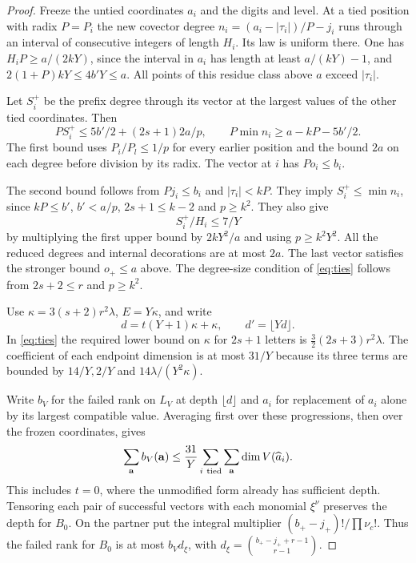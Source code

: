 \begin{proof}
Freeze the untied coordinates \(a_i\) and the digits and level.
At a tied position with radix \(P=P_i\) the new covector degree
\(n_i=(a_i-|\tau_i|)/P-j_i\) runs through an interval of
consecutive integers of length \(H_i\). Its law is uniform there.
One has \(H_iP\ge a/(2kY)\), since the interval in \(a_i\)
has length at least \(a/(kY)-1\), and
\(2(1+P)kY\le4b'Y\le a\). All points of this residue class above
\(a\) exceed \(|\tau_i|\).

Let \(S_i^+\) be the prefix degree
through its vector at the largest values of the other tied
coordinates. Then
\[
 P S_i^+\le 5b'/2+(2s+1)2a/p,\qquad
 P\min n_i\ge a-kP-5b'/2.
\]
The first bound uses \(P_i/P_l\le1/p\) for every earlier position
and the bound \(2a\) on each degree before division by its radix.
The vector at \(i\) has \(Po_i\le b_i\).

The second bound follows
from \(Pj_i\le b_i\) and \(|\tau_i|<kP\).
They imply \(S_i^+\le\min n_i\), since \(kP\le b'\),
\(b'<a/p\), \(2s+1\le k-2\) and \(p\ge k^2\).
They also give
\[
 S_i^+/H_i\le7/Y
\]
by multiplying the
first upper bound by \(2kY^2/a\) and using \(p\ge k^2Y^2\).
All the reduced degrees and internal decorations are at most \(2a\).
The last vector satisfies the stronger bound \(o_+\le a\) above.
The degree-size condition of \eqref{eq:ties} follows from
\(2s+2\le r\) and \(p\ge k^2\).

Use \(\kappa=3(s+2)r^2\lambda\), \(E=Y\kappa\), and write
\begin{equation}\label{eq:segment-mean-depth}
 d=t(Y+1)\kappa+\kappa,\qquad d'=\lfloor Yd\rfloor.
\end{equation}
In \eqref{eq:ties} the required lower bound on \(\kappa\) for
\(2s+1\) letters is \(\tfrac32(2s+3)r^2\lambda\).
The coefficient of each endpoint dimension is at most \(31/Y\)
because its three terms are bounded by \(14/Y,2/Y\) and
\(14\lambda/(Y^2\kappa)\).

Write \(b_V\) for the failed rank on
\(L_V\) at depth \(\lfloor d\rfloor\) and \(\widehat a_i\) for
replacement of \(a_i\) alone by its largest compatible value.
Averaging first over these progressions, then over the frozen
coordinates, gives
\begin{equation}\label{eq:seg-interior}
 \sum_{\mathbf a} b_V(\mathbf a)
   \le \frac{31}{Y}\sum_{i\ {\rm tied}}\sum_{\mathbf a}
                     \dim V(\widehat a_i).
\end{equation}
This includes \(t=0\), where the unmodified form already has
sufficient depth. Tensoring each pair of successful vectors with
each monomial \(\xi^\nu\) preserves the depth for \(B_0\).
On the partner put the integral multiplier
\((b_+-j_+)!/\prod\nu_c!\). Thus the failed rank for \(B_0\)
is at most \(b_V d_\xi\), with
\(d_\xi=\binom{b_+-j_++r-1}{r-1}\).


\end{proof}
